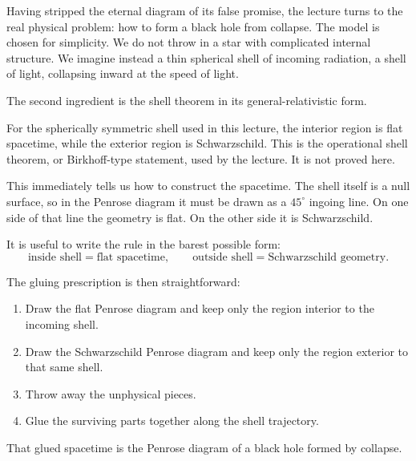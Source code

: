 Having stripped the eternal diagram of its false promise, the lecture turns to the real physical problem: how to form a black hole from collapse. The model is chosen for simplicity. We do not throw in a star with complicated internal structure. We imagine instead a thin spherical shell of incoming radiation, a shell of light, collapsing inward at the speed of light.

The second ingredient is the shell theorem in its general-relativistic form.

\begin{remark}
For the spherically symmetric shell used in this lecture, the interior region is flat spacetime, while the exterior region is Schwarzschild. This is the operational shell theorem, or Birkhoff-type statement, used by the lecture. It is not proved here.
\end{remark}

This immediately tells us how to construct the spacetime. The shell itself is a null surface, so in the Penrose diagram it must be drawn as a \(45^\circ\) ingoing line. On one side of that line the geometry is flat. On the other side it is Schwarzschild.

It is useful to write the rule in the barest possible form:
\begin{equation}
\text{inside shell} = \text{flat spacetime},
\qquad
\text{outside shell} = \text{Schwarzschild geometry}.
\end{equation}

The gluing prescription is then straightforward:

\begin{enumerate}
\item Draw the flat Penrose diagram and keep only the region interior to the incoming shell.
\item Draw the Schwarzschild Penrose diagram and keep only the region exterior to that same shell.
\item Throw away the unphysical pieces.
\item Glue the surviving parts together along the shell trajectory.
\end{enumerate}

That glued spacetime is the Penrose diagram of a black hole formed by collapse.

